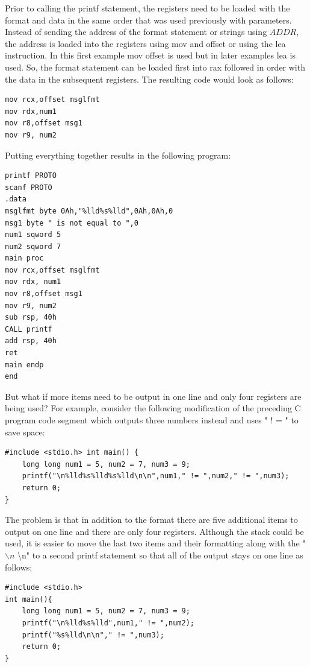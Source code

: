 \documentclass[10pt]{book}
\begin{document}
\begin{center}
\begin{center}
\begin{center}
\begin{center}
Prior to calling the printf statement, the registers need to be loaded with the format and data in the same order that was used previously with parameters. Instead of sending the address of the format statement or strings using $A D D R$, the address is loaded into the registers using mov and offset or using the lea instruction. In this first example mov offset is used but in later examples lea is used. So, the format statement can be loaded first into rax followed in order with the data in the subsequent registers. The resulting code would look as follows:

\begin{verbatim}
mov rcx,offset msglfmt
mov rdx,num1
mov r8,offset msg1
mov r9, num2
\end{verbatim}

Putting everything together results in the following program:

\begin{verbatim}
printf PROTO
scanf PROTO
.data
msglfmt byte 0Ah,"%lld%s%lld",0Ah,0Ah,0
msg1 byte " is not equal to ",0
num1 sqword 5
num2 sqword 7
main proc
mov rcx,offset msglfmt
mov rdx, num1
mov r8,offset msg1
mov r9, num2
sub rsp, 40h
CALL printf
add rsp, 40h
ret
main endp
end
\end{verbatim}

But what if more items need to be output in one line and only four registers are being used? For example, consider the following modification of the preceding C program code segment which outputs three numbers instead and uses " ! = " to save space:

\begin{verbatim}
#include <stdio.h> int main() {
    long long num1 = 5, num2 = 7, num3 = 9;
    printf("\n%lld%s%lld%s%lld\n\n",num1," != ",num2," != ",num3);
    return 0;
}
\end{verbatim}

The problem is that in addition to the format there are five additional items to output on one line and there are only four registers. Although the stack could be used, it is easier to move the last two items and their formatting along with the " $\backslash n$ \textbackslash n" to a second printf statement so that all of the output stays on one line as follows:

\begin{verbatim}
#include <stdio.h>
int main(){
    long long num1 = 5, num2 = 7, num3 = 9;
    printf("\n%lld%s%lld",num1," != ",num2);
    printf("%s%lld\n\n"," != ",num3);
    return 0;
}
\end{verbatim}


\end{center}
\end{center}
\end{center}
\end{center}
\end{document}
